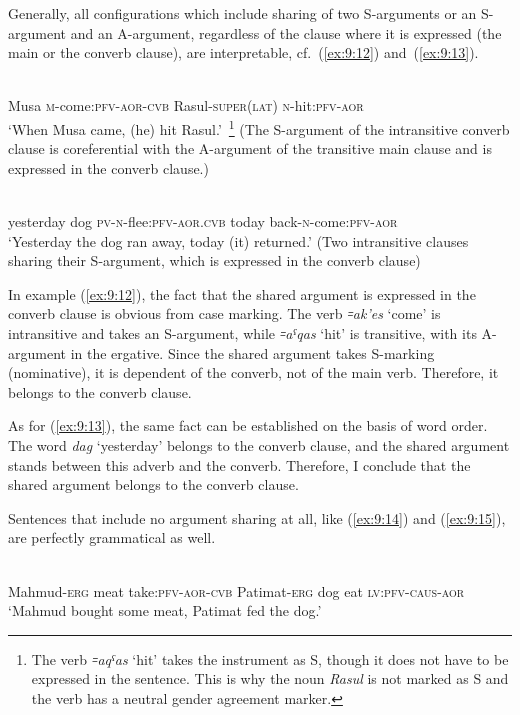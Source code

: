 ﻿\documentclass[output=paper]{langsci/langscibook}
\begin{document}
Generally, all configurations which include sharing of two S-arguments
or an S-argument and an A-argument, regardless of the clause where it is
expressed (the main or the converb clause), are interpretable, cf.\ (\ref{ex:9:12}) and~(\ref{ex:9:13}).

\ea \label{ex:9:12} %
\\
Musa \textsc{m}-come:\textsc{pfv}-\textsc{aor}-\textsc{cvb} Rasul-\textsc{super}(\textsc{lat}) \textsc{n}-hit:\textsc{pfv}-\textsc{aor}\\
\glt `When Musa came, (he) hit Rasul.'~\footnote{The verb \emph{꞊aqˤas} 
`hit' takes the instrument as S, though it does not have to be expressed in the
  sentence. This is why the noun \emph{Rasul} is not marked as S and the
  verb has a neutral gender agreement marker.} (The S-argument of the
intransitive converb clause is coreferential with the A-argument of the
transitive main clause and is expressed in the converb clause.)

\ex \label{ex:9:13} %
\\
yesterday dog \textsc{pv}-\textsc{n}-flee:\textsc{pfv}-\textsc{aor.cvb} today back-\textsc{n}-come:\textsc{pfv}-\textsc{aor}\\
\glt `Yesterday the dog ran away, today (it) returned.' (Two intransitive
clauses sharing their S-argument, which is expressed in the converb
clause)
\z

In example (\ref{ex:9:12}), the fact that the shared argument is expressed in the
converb clause is obvious from case marking. The verb \emph{꞊ak'es} `come' 
is intransitive and takes an S-argument, while \emph{꞊aˤqas} `hit' 
is transitive, with its A-argument in the ergative. Since the
shared argument takes S-marking (nominative), it is dependent of the
converb, not of the main verb. Therefore, it belongs to the converb
clause.

As for (\ref{ex:9:13}), the same fact can be established on the basis of word order.
The word \emph{dag} `yesterday' belongs to the converb clause, and the
shared argument stands between this adverb and the converb. Therefore,
I conclude that the shared argument belongs to the converb clause.

Sentences that include no argument sharing at all, like (\ref{ex:9:14}) and (\ref{ex:9:15}),
are perfectly grammatical as well.

\ea \label{ex:9:14} %
\\
Mahmud-\textsc{erg} meat take:\textsc{pfv}-\textsc{aor}-\textsc{cvb} Patimat-\textsc{erg} dog eat \textsc{lv}:\textsc{pfv}-\textsc{caus}-\textsc{aor}\\
\glt `Mahmud bought some meat, Patimat fed the dog.'
\end{document}
